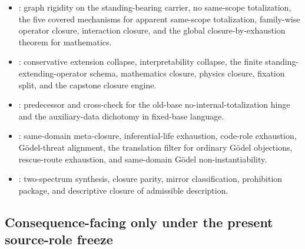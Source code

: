 \begin{itemize}
  \item \sameoperatorsdoc{}: graph rigidity on the standing-bearing carrier, no same-scope totalization, the five covered mechanisms for apparent same-scope totalization, family-wise operator closure, interaction closure, and the global closure-by-exhaustion theorem for mathematics.
  \item \clausuradoc{}: conservative extension collapse, interpretability collapse, the finite standing-extending-operator schema, mathematics closure, physics closure, fixation split, and the capstone closure engine.
  \item \fixedbasedoc{}: predecessor and cross-check for the old-base no-internal-totalization hinge and the auxiliary-data dichotomy in fixed-base language.
  \item \noninstgodeldoc{}: same-domain meta-closure, inferential-life exhaustion, code-role exhaustion, G\"odel-threat alignment, the translation filter for ordinary G\"odel objections, rescue-route exhaustion, and same-domain G\"odel non-instantiability.
  \item \eademdoc{}: two-spectrum synthesis, closure parity, mirror classification, prohibition package, and descriptive closure of admissible description.
\end{itemize}

\subsection*{Consequence-facing only under the present source-role freeze}


